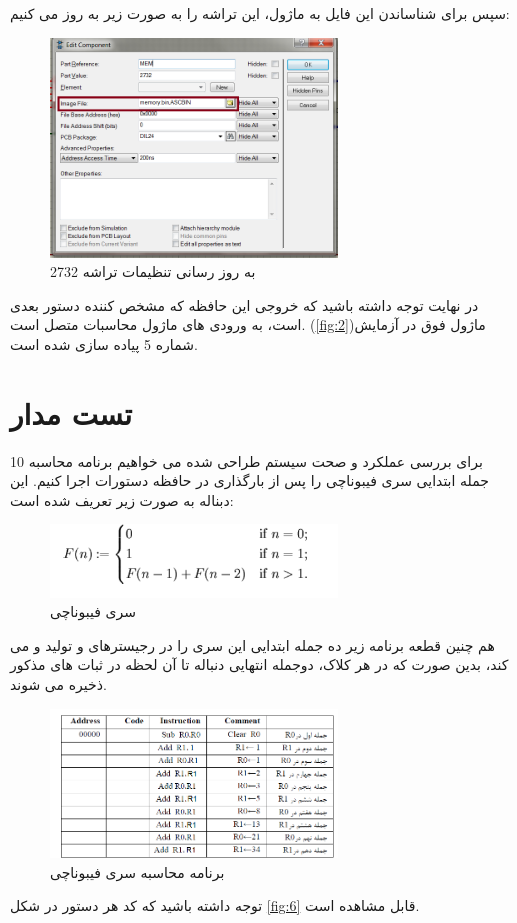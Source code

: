 \documentclass[12pt,onecolumn,a4paper,fleqn]{article}
\begin{document}
	 سپس برای شناساندن این فایل به ماژول،  این تراشه را به صورت زیر به روز می کنیم:
	 \begin{figure}[H]
	 							\centering
	 							\includegraphics[width=0.68\textwidth]{source/7.png}
	 							\caption{به روز رسانی تنظیمات تراشه 2732}
	 							\label{fig:7}
	 \end{figure}
	 در نهایت توجه داشته باشید که خروجی این حافظه که مشخص کننده دستور بعدی است، به ورودی های ماژول محاسبات  متصل است. (\ref{fig:2})ماژول فوق در آزمایش شماره 5 پیاده سازی شده است.
\section{تست مدار}
برای بررسی عملکرد و صحت سیستم طراحی شده می خواهیم برنامه محاسبه 10 جمله ابتدایی سری فیبوناچی را پس از بارگذاری در حافظه دستورات اجرا کنیم. این دبناله به صورت زیر تعریف شده است:
 \begin{figure}[H]
 	 							\centering
 	 							\includegraphics[width=0.68\textwidth]{source/8.png}
 	 							\caption{سری فیبوناچی}
 	 							\label{fig:8}
 \end{figure}
 هم چنین قطعه برنامه زیر ده جمله ابتدایی این سری را در رجیسترهای  و  تولید و می کند، بدین صورت که در هر کلاک، دوجمله انتهایی دنباله تا آن لحظه در ثبات های مذکور ذخیره می شوند.
 \begin{figure}[H]
 	 							\centering
 	 							\includegraphics[width=0.68\textwidth]{source/9.png}
 	 							\caption{برنامه محاسبه سری فیبوناچی}
 	 							\label{fig:9}
 \end{figure}
 توجه داشته باشید که کد هر دستور در شکل \ref{fig:6} قابل مشاهده است.
 
\end{document}
